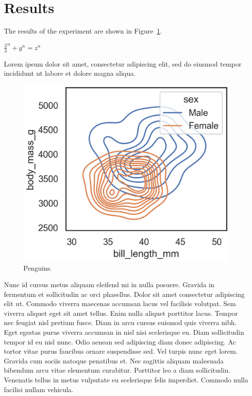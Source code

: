 

\section{Results}

The results of the experiment are shown in Figure~\ref{fig:penguins}.

$ \frac{2}{3} ^n + y^n = z^n $

Lorem ipsum dolor sit amet, consectetur adipiscing elit, sed do eiusmod tempor incididunt ut labore et dolore magna aliqua.

\begin{figure}[]
    \centering
    \includegraphics[width=\linewidth]{figures/penguins_distribution.png}
    \caption{Penguins.}
    \label{fig:penguins}
\end{figure}

Nunc id cursus metus aliquam eleifend mi in nulla posuere. Gravida in fermentum et sollicitudin ac orci phasellus. Dolor sit amet consectetur adipiscing elit ut. Commodo viverra maecenas accumsan lacus vel facilisis volutpat. Sem viverra aliquet eget sit amet tellus. Enim nulla aliquet porttitor lacus. Tempor nec feugiat nisl pretium fusce. Diam in arcu cursus euismod quis viverra nibh. Eget egestas purus viverra accumsan in nisl nisi scelerisque eu. Diam sollicitudin tempor id eu nisl nunc. Odio aenean sed adipiscing diam donec adipiscing. Ac tortor vitae purus faucibus ornare suspendisse sed. Vel turpis nunc eget lorem. Gravida cum sociis natoque penatibus et. Nec sagittis aliquam malesuada bibendum arcu vitae elementum curabitur. Porttitor leo a diam sollicitudin. Venenatis tellus in metus vulputate eu scelerisque felis imperdiet. Commodo nulla facilisi nullam vehicula.

